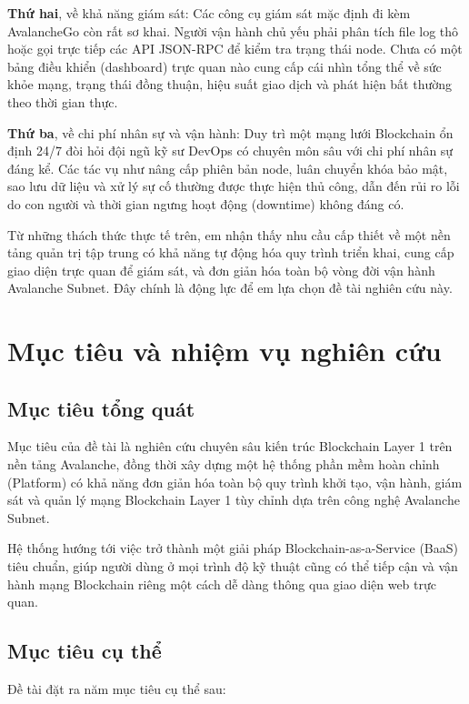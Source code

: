 \textbf{Thứ hai}, về khả năng giám sát: Các công cụ giám sát mặc định đi kèm AvalancheGo còn rất sơ khai. Người vận hành chủ yếu phải phân tích file log thô hoặc gọi trực tiếp các API JSON-RPC để kiểm tra trạng thái node. Chưa có một bảng điều khiển (dashboard) trực quan nào cung cấp cái nhìn tổng thể về sức khỏe mạng, trạng thái đồng thuận, hiệu suất giao dịch và phát hiện bất thường theo thời gian thực.

\textbf{Thứ ba}, về chi phí nhân sự và vận hành: Duy trì một mạng lưới Blockchain ổn định 24/7 đòi hỏi đội ngũ kỹ sư DevOps có chuyên môn sâu với chi phí nhân sự đáng kể. Các tác vụ như nâng cấp phiên bản node, luân chuyển khóa bảo mật, sao lưu dữ liệu và xử lý sự cố thường được thực hiện thủ công, dẫn đến rủi ro lỗi do con người và thời gian ngưng hoạt động (downtime) không đáng có.

Từ những thách thức thực tế trên, em nhận thấy nhu cầu cấp thiết về một nền tảng quản trị tập trung có khả năng tự động hóa quy trình triển khai, cung cấp giao diện trực quan để giám sát, và đơn giản hóa toàn bộ vòng đời vận hành Avalanche Subnet. Đây chính là động lực để em lựa chọn đề tài nghiên cứu này.

\section{Mục tiêu và nhiệm vụ nghiên cứu}

\subsection{Mục tiêu tổng quát}

Mục tiêu của đề tài là nghiên cứu chuyên sâu kiến trúc Blockchain Layer 1 trên nền tảng Avalanche, đồng thời xây dựng một hệ thống phần mềm hoàn chỉnh (Platform) có khả năng đơn giản hóa toàn bộ quy trình khởi tạo, vận hành, giám sát và quản lý mạng Blockchain Layer 1 tùy chỉnh dựa trên công nghệ Avalanche Subnet.

Hệ thống hướng tới việc trở thành một giải pháp Blockchain-as-a-Service (BaaS) tiêu chuẩn, giúp người dùng ở mọi trình độ kỹ thuật cũng có thể tiếp cận và vận hành mạng Blockchain riêng một cách dễ dàng thông qua giao diện web trực quan.

\subsection{Mục tiêu cụ thể}

Đề tài đặt ra năm mục tiêu cụ thể sau:


